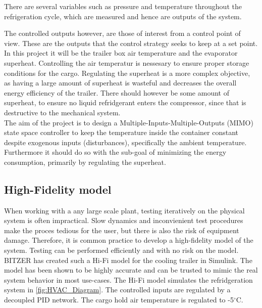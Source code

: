 There are several variables such as pressure and temperature throughout the refrigeration cycle, which are measured and hence are outputs of the system. 

The controlled outputs however, are those of interest from a control point of view. These are the outputs that the control strategy seeks to keep at a set point. In this project it will be the trailer box air temperature and the evaporator superheat. Controlling the air temperatur is nessesary to ensure proper storage conditions for the cargo. Regulating the superheat is a more complex objective, as having a large amount of superheat is wasteful and decreases the overall energy efficiency of the trailer. There should however be some amount of superheat, to ensure no liquid refridgerant enters the compressor, since that is destructive to the mechanical system.\\

The aim of the project is to design a Multiple-Inputs-Multiple-Outputs (MIMO) state space controller to keep the temperature inside the container constant despite exogenous inputs (disturbances), specifically the ambient temperature. Furthermore it should do so with the sub-goal of minimizing the energy consumption, primarily by regulating the superheat.\\





\subsection{High-Fidelity model}
When working with a any large scale plant, testing iteratively on the physical system is often impractical. Slow dynamics and inconvienient test procedures make the proces tedious for the user, but there is also the risk of equipment damage. Therefore, it is common practice to develop a high-fidelity model of the system. Testing can be performed efficiently and with no risk on the model. \\

BITZER has created such a Hi-Fi model for the cooling trailer in Simulink. The model has been shown to be highly accurate and can be trusted to mimic the real system behavior in most use-cases. The Hi-Fi model simulates the refridgeration system in \cref{fig:HVAC_Diagram}. The controlled inputs are regulated by a decoupled PID network. The cargo hold air temperature is regulated to -5$^{\circ}$C.\\

